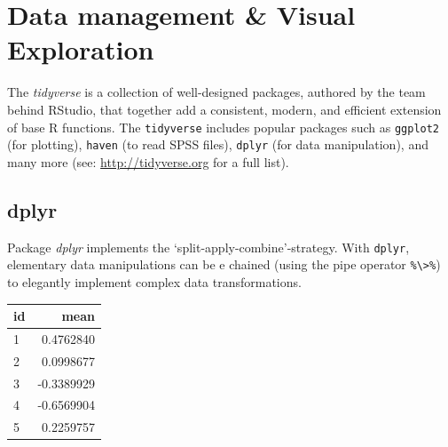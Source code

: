 \documentclass[]{book}
\newenvironment{Shaded}{\begin{snugshade}}{\end{snugshade}}
\newcommand{\KeywordTok}[1]{\textcolor[rgb]{0.13,0.29,0.53}{\textbf{#1}}}
\newcommand{\DataTypeTok}[1]{\textcolor[rgb]{0.13,0.29,0.53}{#1}}
\newcommand{\DecValTok}[1]{\textcolor[rgb]{0.00,0.00,0.81}{#1}}
\newcommand{\StringTok}[1]{\textcolor[rgb]{0.31,0.60,0.02}{#1}}
\newcommand{\CommentTok}[1]{\textcolor[rgb]{0.56,0.35,0.01}{\textit{#1}}}
\newcommand{\OperatorTok}[1]{\textcolor[rgb]{0.81,0.36,0.00}{\textbf{#1}}}
\newcommand{\NormalTok}[1]{#1}
\begin{document}
\section{Data management \& Visual
Exploration}\label{data-management-visual-exploration}


The \emph{tidyverse} is a collection of well-designed packages, authored
by the team behind RStudio, that together add a consistent, modern, and
efficient extension of base R functions. The \texttt{tidyverse} includes
popular packages such as \texttt{ggplot2} (for plotting), \texttt{haven}
(to read SPSS files), \texttt{dplyr} (for data manipulation), and many
more (see: \url{http://tidyverse.org} for a full list).

\subsection{dplyr}\label{dplyr}


Package \emph{dplyr} \citep{R-dplyr} implements the
`split-apply-combine'-strategy. With \texttt{dplyr}, elementary data
manipulations can be e chained (using the pipe operator
\texttt{\%\textbackslash{}\textgreater{}\%}) to elegantly implement
complex data transformations.

\begin{Shaded}
\end{Shaded}

\begin{tabular}{l|r}
\hline
id & mean\\
\hline
1 & 0.4762840\\
\hline
2 & 0.0998677\\
\hline
3 & -0.3389929\\
\hline
4 & -0.6569904\\
\hline
5 & 0.2259757\\
\hline
\end{tabular}
\end{document}
